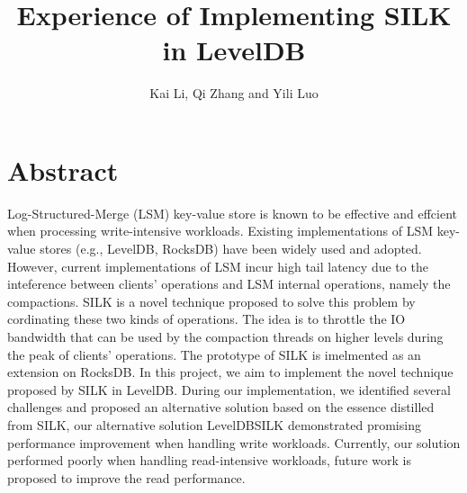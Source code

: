 \documentclass[letter,twocolumn,10pt]{article}
\begin{document}
\date{}

\title{\Large \textbf{Experience of Implementing SILK in LevelDB}}
\author{Kai Li, Qi Zhang and Yili Luo}
\maketitle

\section*{Abstract}
Log-Structured-Merge (LSM) key-value store is known to be effective and effcient when processing write-intensive workloads. Existing implementations of LSM key-value stores (e.g., LevelDB, RocksDB) have been widely used and adopted. However, current implementations of LSM incur high tail latency due to the inteference between clients' operations and LSM internal operations, namely the compactions. SILK is a novel technique proposed to solve this problem by cordinating these two kinds of operations. The idea is to throttle the IO bandwidth that can be used by the compaction threads on higher levels during the peak of clients' operations. The prototype of SILK is imelmented as an extension on RocksDB. In this project, we aim to implement the novel technique proposed by SILK in LevelDB. During our implementation, we identified several challenges and proposed an alternative solution based on the essence distilled from SILK, our alternative solution LevelDBSILK demonstrated promising performance improvement when handling write workloads. Currently, our solution performed poorly when handling read-intensive workloads, future work is proposed to improve the read performance.
\end{document}
